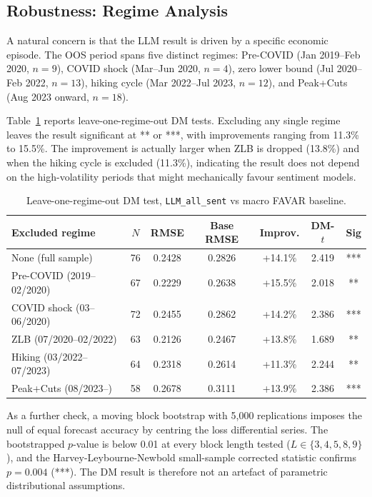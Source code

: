 \subsection{Robustness: Regime Analysis}

A natural concern is that the LLM result is driven by a specific economic episode. The OOS period spans five distinct regimes: Pre-COVID (Jan 2019--Feb 2020, $n = 9$), COVID shock (Mar--Jun 2020, $n = 4$), zero lower bound (Jul 2020--Feb 2022, $n = 13$), hiking cycle (Mar 2022--Jul 2023, $n = 12$), and Peak+Cuts (Aug 2023 onward, $n = 18$).

Table~\ref{tab:regimes} reports leave-one-regime-out DM tests. Excluding any single regime leaves the result significant at ** or ***, with improvements ranging from 11.3\% to 15.5\%. The improvement is actually larger when ZLB is dropped (13.8\%) and when the hiking cycle is excluded (11.3\%), indicating the result does not depend on the high-volatility periods that might mechanically favour sentiment models.

\begin{table}[ht]
\centering
\caption{Leave-one-regime-out DM test, \texttt{LLM\_all\_sent} vs macro FAVAR baseline.}
\label{tab:regimes}
\small
\begin{tabular}{lcccccc}
\toprule
Excluded regime & $N$ & RMSE & Base RMSE & Improv. & DM-$t$ & Sig \\
\midrule
None (full sample)              & 76 & 0.2428 & 0.2826 & +14.1\% & 2.419 & *** \\
Pre-COVID (2019--02/2020)       & 67 & 0.2229 & 0.2638 & +15.5\% & 2.018 & **  \\
COVID shock (03--06/2020)       & 72 & 0.2455 & 0.2862 & +14.2\% & 2.386 & *** \\
ZLB (07/2020--02/2022)          & 63 & 0.2126 & 0.2467 & +13.8\% & 1.689 & **  \\
Hiking (03/2022--07/2023)       & 64 & 0.2318 & 0.2614 & +11.3\% & 2.244 & **  \\
Peak+Cuts (08/2023--)           & 58 & 0.2678 & 0.3111 & +13.9\% & 2.386 & *** \\
\bottomrule
\end{tabular}
\end{table}

As a further check, a moving block bootstrap with 5,000 replications imposes the null of equal forecast accuracy by centring the loss differential series. The bootstrapped $p$-value is below 0.01 at every block length tested ($L \in \{3, 4, 5, 8, 9\}$), and the Harvey-Leybourne-Newbold small-sample corrected statistic confirms $p = 0.004$ (***). The DM result is therefore not an artefact of parametric distributional assumptions.

